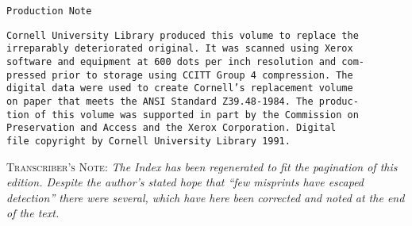 \documentclass[oneside]{book}
\begin{document}
\pagestyle{empty}

\thispagestyle{empty}
\small
\pagestyle {empty}



\begin{center}
\texttt{Production Note}
\end{center}

\noindent
\texttt{Cornell University Library produced this volume to replace the \\
irreparably deteriorated original. It was scanned using Xerox \\
software and equipment at 600 dots per inch resolution and com- \\
pressed prior to storage using CCITT Group 4 compression. The \\
digital data were used to create Cornell's replacement volume \\
on paper that meets the ANSI Standard Z39.48-1984. The produc- \\
tion of this volume was supported in part by the Commission on \\
Preservation and Access and the Xerox Corporation. Digital \\
file copyright by Cornell University Library 1991.}

\bigskip\bigskip
\scriptsize \noindent \textsc{Transcriber's Note:} \emph{The Index has been regenerated
to fit the pagination of this edition. Despite the author's stated hope that ``few misprints
have escaped detection'' there were several, which have here been corrected and
noted at the end of the text.} \normalsize


\vfill
\begin{center}
\end{center}
\vfill
\newpage
\end{document}
